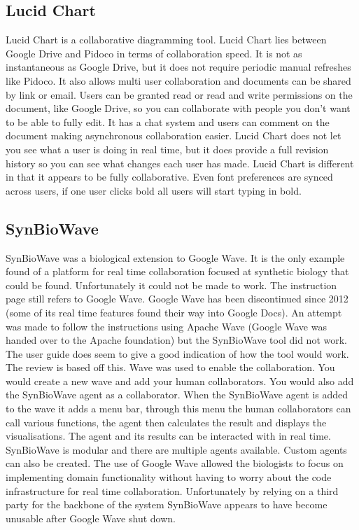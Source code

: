 \subsection{Lucid Chart}
Lucid Chart is a collaborative diagramming tool.  Lucid Chart lies between Google Drive and Pidoco in terms of collaboration speed.  It is not as instantaneous as Google Drive, but it does not require periodic manual refreshes like Pidoco.  It also allows multi user collaboration and documents can be shared by link or email.  Users can be granted read or read and write permissions on the document, like Google Drive, so you can collaborate with people you don't want to be able to fully edit.  It has a chat system and users can comment on the document making asynchronous collaboration easier.  Lucid Chart does not let you see what a user is doing in real time, but it does provide a full revision history so you can see what changes each user has made.  Lucid Chart is different in that it appears to be fully collaborative. Even font preferences are synced across users, if one user clicks bold all users will start typing in bold.

\subsection{SynBioWave}

SynBioWave was a biological extension to Google Wave.  It is the only example found of a platform for real time collaboration focused at synthetic biology that could be found.  Unfortunately it could not be made to work.  The instruction page still refers to Google Wave.  Google Wave has been discontinued since 2012 (some of its real time features found their way into Google Docs).  An attempt was made to follow the instructions using Apache Wave (Google Wave was handed over to the Apache foundation) but the SynBioWave tool did not work.  The user guide does seem to give a good indication of how the tool would work.  The review is based off this.  Wave was used to enable the collaboration.  You would create a new wave and add your human collaborators.  You would also add the SynBioWave agent as a collaborator.   When the SynBioWave agent is added to the wave it adds a menu bar, through this menu the human collaborators can call various functions, the agent then calculates the result and displays the visualisations.  The agent and its results can be interacted with in real time. SynBioWave is modular and there are multiple agents available.  Custom agents can also be created.  The use of Google Wave allowed the biologists to focus on implementing domain functionality without having to worry about the code infrastructure for real time collaboration.  Unfortunately by relying on a third party for the backbone of the system SynBioWave appears to have become unusable after Google Wave shut down.

